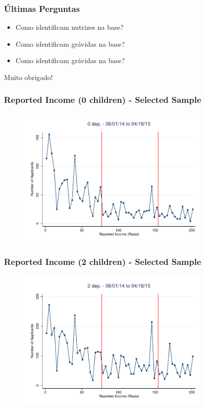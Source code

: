 \documentclass[xcolor=pdftex,dvipsnames,table]{beamer}
\begin{document}
\begin{frame}
\frametitle{\'Ultimas Perguntas}
\begin{itemize}
\item Como identificam nutrizes na base?
\item Como identificam gr\'avidas na base?
\item Como identificam gr\'avidas na base?
\end{itemize}
\end{frame}

\begin{frame}
Muito obrigado!
\end{frame}

\appendix
{}
\setcounter{finalframe}{\value{framenumber}}

\begin{frame}[label=ybar0_sel]
\frametitle{Reported Income  (0 children) - Selected Sample}
\begin{figure}[H]
\begin{center}
\includegraphics[height=2.7in]{Dom1_060114_non_0_bin3p5.pdf}
\end{center}
\end{figure}
\hyperlink{ybar0}{}
\end{frame}

\begin{frame}[label=ybar2_sel]
\frametitle{Reported Income (2 children) - Selected Sample}
\begin{figure}[H]
\begin{center}
\includegraphics[height=2.7in]{Dom1_060114_non_2_bin3p5.pdf}
\end{center}
\end{figure}
\hyperlink{ybar2}{}
\end{frame}
\end{document}
